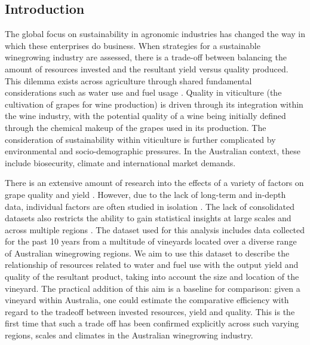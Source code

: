 \documentclass[review,12pt,authoryear]{elsarticle}
\begin{document}
\begin{linenumbers}

\section{Introduction}
The global focus on sustainability in agronomic industries has changed the way in which these enterprises do business. When strategies for a sustainable winegrowing industry are assessed, there is a trade-off between balancing the amount of resources invested and the resultant yield versus quality produced. This dilemma exists across agriculture through shared fundamental considerations such as water use and fuel usage \citep{hemmingCherryTomatoProduction2020,kawasakiQualityMattersMore2016, zhuEffectsNitrogenLevel2017}. Quality in viticulture (the cultivation of grapes for wine production) is driven through its integration within the wine industry, with the potential quality of a wine being initially defined through the chemical makeup of the grapes used in its production. The consideration of sustainability within viticulture is further complicated by environmental and socio-demographic pressures. In the Australian context, these include biosecurity, climate and international market demands.
\par
There is an extensive amount of research into the effects of a variety of factors on grape quality and yield \citep{heFruitYieldPrediction2022,laurentLocalInfluenceClimate2022,liakosMachineLearningAgriculture2018}. However, due to the lack of long-term and in-depth data, individual factors are often studied in isolation \citep{abbalDecisionSupportSystem2016}. The lack of consolidated datasets also restricts the ability to gain statistical insights at large scales and across multiple regions \citep{keithjonesAustralianWineIndustry2002,knightFirmResourcesDevelopment2019}. The dataset used for this analysis includes data collected for the past 10 years from a multitude of vineyards located over a diverse range of Australian winegrowing regions. We aim to use this dataset to describe the relationship of resources related to water and fuel use with the output yield and quality of the resultant product, taking into account the size and location of the vineyard. The practical addition of this aim is a baseline for comparison: given a vineyard within Australia, one could estimate the comparative efficiency with regard to the tradeoff between invested resources, yield and quality. This is the first time that such a trade off has been confirmed explicitly across such varying regions, scales and climates in the Australian winegrowing industry.

\end{linenumbers}
\end{document}
